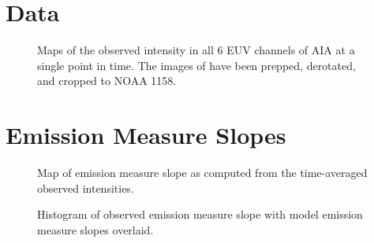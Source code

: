\section{Data}\label{data}


\begin{figure*}
    \caption{Maps of the observed intensity in all 6 EUV channels of AIA at a single point in time. The images of have been prepped, derotated, and cropped to \AR{} NOAA 1158.}
    \label{fig:intensity_maps}
\end{figure*}


\section{Emission Measure Slopes}\label{em_slopes}


\begin{figure}
    \caption{Map of emission measure slope as computed from the time-averaged observed intensities.}
    \label{fig:em_slope_map}
\end{figure}

\begin{figure}
    \caption{Histogram of observed emission measure slope with model emission measure slopes overlaid.}
    \label{fig:em_slope_histogram}
\end{figure}

